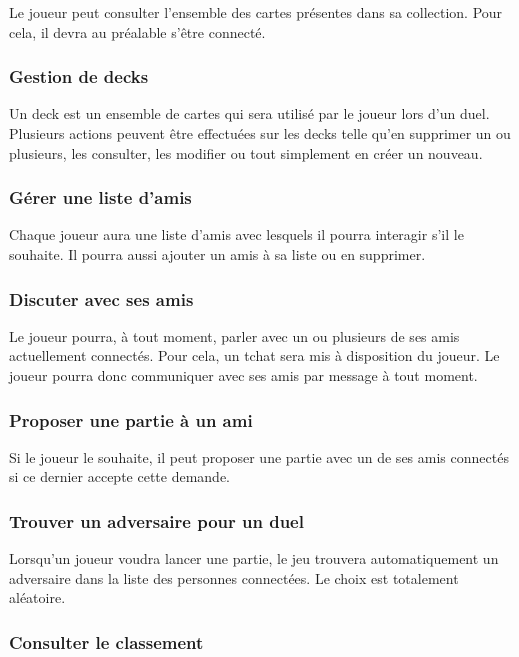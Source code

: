 \documentclass[11pt,a4paper]{article}
\begin{document}
Le joueur peut consulter l'ensemble des cartes présentes dans sa
collection. Pour cela, il devra au préalable s'être connecté.

\subsubsection{Gestion de decks}

Un deck est un ensemble de cartes qui sera utilisé par le joueur
lors d'un duel. Plusieurs actions peuvent être effectuées sur les
decks telle qu'en supprimer un ou plusieurs, les consulter, les
modifier ou tout simplement en créer un nouveau.

\subsubsection{Gérer une liste d'amis}

Chaque joueur aura une liste d'amis avec lesquels il pourra
interagir s'il le souhaite. Il pourra aussi ajouter un amis à sa
liste ou en supprimer.

\subsubsection{Discuter avec ses amis}

Le joueur pourra, à tout moment, parler avec un ou plusieurs de ses
amis actuellement connectés. Pour cela, un tchat sera mis à
disposition du joueur.  Le joueur pourra donc communiquer avec ses
amis par message à tout moment.

\subsubsection{Proposer une partie à un ami}

Si le joueur le souhaite, il peut proposer une partie avec un de ses
amis connectés si ce dernier accepte cette demande.

\subsubsection{Trouver un adversaire pour un duel}

Lorsqu'un joueur voudra lancer une partie, le jeu trouvera
automatiquement un adversaire dans la liste des personnes
connectées.  Le choix est totalement aléatoire.

\subsubsection{Consulter le classement}
\end{document}
